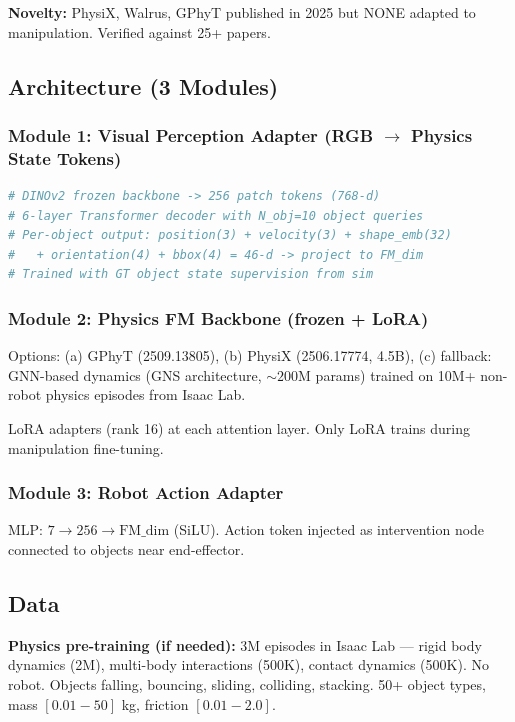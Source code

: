 \documentclass[11pt,a4paper]{article}
\begin{document}
\textbf{Novelty:} PhysiX, Walrus, GPhyT published in 2025 but NONE adapted to manipulation. Verified against 25+ papers.

\subsection{Architecture (3 Modules)}

\subsubsection{Module 1: Visual Perception Adapter (RGB $\to$ Physics State Tokens)}
\begin{lstlisting}[language=Python, caption=Perception Adapter]
# DINOv2 frozen backbone -> 256 patch tokens (768-d)
# 6-layer Transformer decoder with N_obj=10 object queries
# Per-object output: position(3) + velocity(3) + shape_emb(32)
#   + orientation(4) + bbox(4) = 46-d -> project to FM_dim
# Trained with GT object state supervision from sim
\end{lstlisting}

\subsubsection{Module 2: Physics FM Backbone (frozen + LoRA)}
Options: (a) GPhyT (2509.13805), (b) PhysiX (2506.17774, 4.5B), (c) fallback: GNN-based dynamics (GNS architecture, ${\sim}200$M params) trained on 10M+ non-robot physics episodes from Isaac Lab.

LoRA adapters (rank 16) at each attention layer. Only LoRA trains during manipulation fine-tuning.

\subsubsection{Module 3: Robot Action Adapter}
MLP: $7 \to 256 \to \text{FM\_dim}$ (SiLU). Action token injected as intervention node connected to objects near end-effector.

\subsection{Data}

\textbf{Physics pre-training (if needed):} 3M episodes in Isaac Lab --- rigid body dynamics (2M), multi-body interactions (500K), contact dynamics (500K). No robot. Objects falling, bouncing, sliding, colliding, stacking. 50+ object types, mass $[0.01{-}50]$ kg, friction $[0.01{-}2.0]$.
\end{document}
